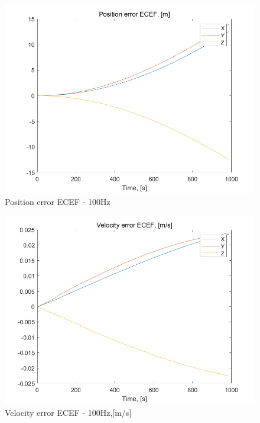 \documentclass[conference]{IEEEtran}
\begin{document}
\begin{figure}[htbp]
    \centerline{\includegraphics[width=1.0\columnwidth]{fig5.png}}
    \caption{Position error ECEF - 100Hz}
\end{figure}

\begin{figure}[htbp]
    \centerline{\includegraphics[width=1.0\columnwidth]{fig6.png}}
    \caption{Velocity error ECEF - 100Hz,[m/s]}
\end{figure}
\end{document}
